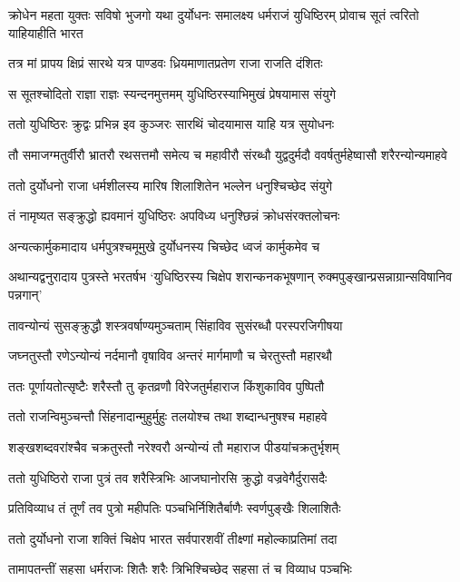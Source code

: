 \threelineshloka
{क्रोधेन महता युक्तः सविषो भुजगो यथा}
{दुर्योधनः समालक्ष्य धर्मराजं युधिष्ठिरम्}
{प्रोवाच सूतं त्वरितो याहियाहीति भारत}


\twolineshloka
{तत्र मां प्रापय क्षिप्रं सारथे यत्र पाण्डवः}
{ध्रियमाणातप्रतेण राजा राजति दंशितः}


\twolineshloka
{स सूतश्चोदितो राज्ञा राज्ञः स्यन्दनमुत्तमम्}
{युधिष्ठिरस्याभिमुखं प्रेषयामास संयुगे}


\twolineshloka
{ततो युधिष्ठिरः क्रुद्वः प्रभिन्न इव कुञ्जरः}
{सारथिं चोदयामास याहि यत्र सुयोधनः}


तौ समाजग्मतुर्वीरौ भ्रातरौ रथसत्तमौ
\twolineshloka
{समेत्य च महावीरौ संरब्धौ युद्वदुर्मदौ}
{ववर्षतुर्महेष्वासौ शरैरन्योन्यमाहवे}


\twolineshloka
{ततो दुर्योधनो राजा धर्मशीलस्य मारिष}
{शिलाशितेन भल्लेन धनुश्चिच्छेद संयुगे}


\twolineshloka
{तं नामृष्यत सङ्क्रुद्धो ह्यवमानं युधिष्ठिरः}
{अपविध्य धनुश्छिन्नं क्रोधसंरक्तलोचनः}


\twolineshloka
{अन्यत्कार्मुकमादाय धर्मपुत्रश्चमूमुखे}
{दुर्योधनस्य चिच्छेद ध्वजं कार्मुकमेव च}


\threelineshloka
{अथान्यद्वनुरादाय पुत्रस्ते भरतर्षभ}
{`युधिष्ठिरस्य चिक्षेप शरान्कनकभूषणान्}
{रुक्मपुङ्खान्प्रसन्नाग्रान्सविषानिव पन्नगान्'}


\twolineshloka
{तावन्योन्यं सुसङ्क्रुद्धौ शस्त्रवर्षाण्यमुञ्चताम्}
{सिंहाविव सुसंरब्धौ परस्परजिगीषया}


\twolineshloka
{जघ्नतुस्तौ रणेऽन्योन्यं नर्दमानौ वृषाविव}
{अन्तरं मार्गमाणौ च चेरतुस्तौ महारथौ}


\twolineshloka
{ततः पूर्णायतोत्सृष्टैः शरैस्तौ तु कृतव्रणौ}
{विरेजतुर्महाराज किंशुकाविव पुष्पितौ}


\twolineshloka
{ततो राजन्विमुञ्चन्तौ सिंहनादान्मुहुर्मुहुः}
{तलयोश्च तथा शब्दान्धनुषश्च महाहवे}


\twolineshloka
{शङ्खशब्दवरांश्चैव चक्रतुस्तौ नरेश्वरौ}
{अन्योन्यं तौ महाराज पीडयांचक्रतुर्भृशम्}


\twolineshloka
{ततो युधिष्ठिरो राजा पुत्रं तव शरैस्त्रिभिः}
{आजघानोरसि क्रुद्धो वज्रवेगैर्दुरासदैः}


\twolineshloka
{प्रतिविव्याध तं तूर्णं तव पुत्रो महीपतिः}
{पञ्चभिर्निशितैर्बाणैः स्वर्णपुङ्खैः शिलाशितैः}


\twolineshloka
{ततो दुर्योधनो राजा शक्तिं चिक्षेप भारत}
{सर्वपारशवीं तीक्ष्णां महोल्काप्रतिमां तदा}


\twolineshloka
{तामापतन्तीं सहसा धर्मराजः शितैः शरैः}
{त्रिभिश्चिच्छेद सहसा तं च विव्याध पञ्चभिः}


